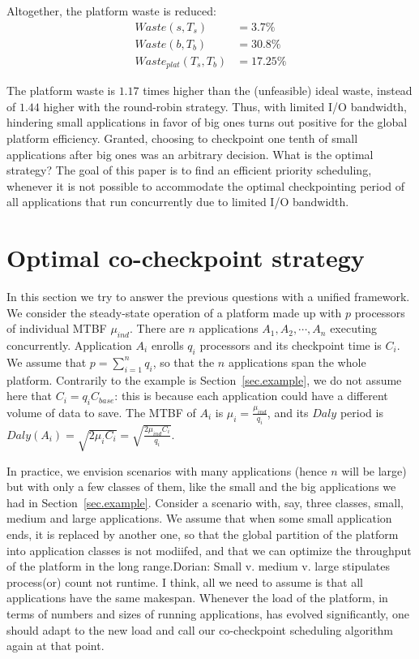 \documentclass{article}
\newcommand{\ema}[1]{\ensuremath{#1}}
\newcommand{\Waste}{\ema{\mathit{Waste}}\xspace}
\newcommand{\Daly}{\ema{\mathit{Daly}}\xspace}
\newcommand{\dca}[1]{{\color{blue}Dorian: #1}}
\begin{document}
Altogether, the platform waste is reduced:
$$
\begin{array}{rl}
\Waste(s, T_{s}) &= 3.7\%\\
\Waste(b, T_{b}) &= 30.8\%\\
\Waste_{plat}(T_{s}, T_{b}) & = 17.25\%
\end{array}
$$

The platform waste is $1.17$ times higher than the (unfeasible) ideal waste, instead of $1.44$ higher with the round-robin strategy. Thus, with limited I/O bandwidth, hindering small applications  in favor of big ones turns out positive for the global platform efficiency. 
Granted, choosing to checkpoint one tenth of small applications after big ones was an arbitrary decision. What is the optimal strategy?
The goal of this paper is to find an efficient priority scheduling, whenever it is not possible to accommodate the optimal checkpointing period of all applications that run concurrently
due to limited I/O bandwidth.


\section{Optimal co-checkpoint strategy}
\label{sec.strategy}

In this section we try to answer the previous questions with a unified framework.
We consider the steady-state operation of a platform made up with $p$ processors of individual MTBF $\mu_{ind}$. There are 
$n$ applications $A_{1}, A_{2}, \cdots, A_{n}$ executing concurrently.  Application $A_{i}$ enrolls $q_{i}$ processors and its checkpoint time is $C_{i}$. We assume that $p = \sum_{i=1}^{n} q_{i}$, so that the $n$ applications span the whole platform. Contrarily to the example is Section~\ref{sec.example},
we do not assume here that $C_{i} = q_{i} C_{\textit{base}}$: this is because each application could have a different volume of data to save. The MTBF of $A_{i}$ is $\mu_{i} = \frac{\mu_{ind}}{q_{i}}$,
and its \Daly period is $\Daly(A_{i}) = \sqrt{2 \mu_{i} C_{i}} = \sqrt{\frac{2 \mu_{ind} C_{i}}{q_{i}}}$. 

In practice, we envision scenarios with many applications (hence $n$ will be large)
but with only a few classes of them, like the small and the big applications we had
in Section~\ref{sec.example}. Consider a scenario with, say, three classes, small,
medium and large applications. We assume that when some small application ends, it is
replaced by another one, so that the global partition of the platform into
application classes is not modiifed, and that we can optimize the throughput of the
platform in the long range.\dca{Small v. medium v. large stipulates process(or) count
  not runtime. I think, all we need to assume is that all applications have the same
  makespan.}  Whenever the load of the platform, in terms of numbers and sizes of
running applications, has evolved significantly, one should adapt to the new load and
call our co-checkpoint scheduling algorithm again at that point.
\end{document}
